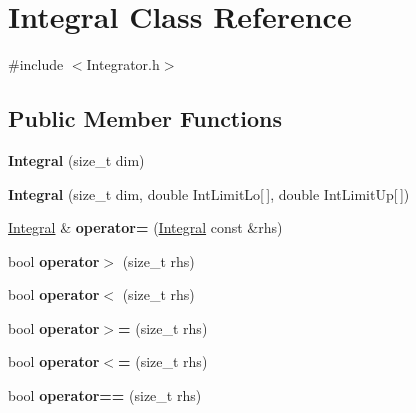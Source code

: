 \hypertarget{classIntegral}{}\section{Integral Class Reference}
\label{classIntegral}


{\ttfamily \#include $<$Integrator.\+h$>$}

\subsection*{Public Member Functions}
\begin{DoxyCompactItemize}
\item 
\hypertarget{classIntegral_a958228701e11668d62cb716a794627ae}{}{\bfseries Integral} (size\+\_\+t dim)\label{classIntegral_a958228701e11668d62cb716a794627ae}

\item 
\hypertarget{classIntegral_af859a39ddd8447a08351b2185b4fa4dc}{}{\bfseries Integral} (size\+\_\+t dim, double Int\+Limit\+Lo\mbox{[}$\,$\mbox{]}, double Int\+Limit\+Up\mbox{[}$\,$\mbox{]})\label{classIntegral_af859a39ddd8447a08351b2185b4fa4dc}

\item 
\hypertarget{classIntegral_af89fcd97e32bbacc527b3f5002498d52}{}\hyperlink{classIntegral}{Integral} \& {\bfseries operator=} (\hyperlink{classIntegral}{Integral} const \&rhs)\label{classIntegral_af89fcd97e32bbacc527b3f5002498d52}

\item 
\hypertarget{classIntegral_a22bfa4c5fcccc8921f314a0594d10273}{}bool {\bfseries operator$>$} (size\+\_\+t rhs)\label{classIntegral_a22bfa4c5fcccc8921f314a0594d10273}

\item 
\hypertarget{classIntegral_a17a701ae693301d53924c0f093e9348e}{}bool {\bfseries operator$<$} (size\+\_\+t rhs)\label{classIntegral_a17a701ae693301d53924c0f093e9348e}

\item 
\hypertarget{classIntegral_afaad3e58d70d8714d47667218fd0b2b2}{}bool {\bfseries operator$>$=} (size\+\_\+t rhs)\label{classIntegral_afaad3e58d70d8714d47667218fd0b2b2}

\item 
\hypertarget{classIntegral_a391da51e4234f840797230301e914c59}{}bool {\bfseries operator$<$=} (size\+\_\+t rhs)\label{classIntegral_a391da51e4234f840797230301e914c59}

\item 
\hypertarget{classIntegral_a114cf52f7967e3595d92f1e3c0bc4681}{}bool {\bfseries operator==} (size\+\_\+t rhs)\label{classIntegral_a114cf52f7967e3595d92f1e3c0bc4681}


\end{DoxyCompactItemize}
